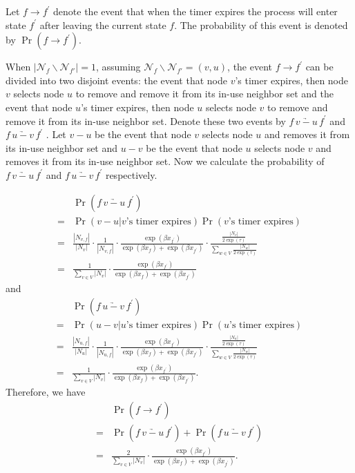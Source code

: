 \documentclass[10pt,conference]{IEEEtran}
\begin{document}
Let $f\rightarrow f^{'}$ denote the event that when the timer expires
the process will enter state $f^{'}$ after leaving the current state
$f$. The probability of this event is denoted by $\Pr(f\rightarrow f^{'})$.

When $|\mathcal{N}_{f}\backslash\mathcal{N}_{f'}|=1$,
assuming $\mathcal{N}_{f}\backslash\mathcal{N}_{f'}=(v,u)$,
the event $f\rightarrow f^{'}$ can be divided into two disjoint events: the
event that node $v$'s timer expires, then node $v$ selects node
$u$ to remove and remove it from its in-use neighbor set and the
event that node $u$'s timer expires, then node $u$ selects node
$v$ to remove and remove it from its in-use neighbor set. Denote
these two events by $f\,\underrightarrow{v-u}\, f^{'}$ and $f\,\underrightarrow{u-v}\, f^{'}$
. Let $v-u$ be the event that node $v$ selects node $u$ and removes
it from its in-use neighbor set and $u-v$ be the event that node
$u$ selects node $v$ and removes it from its in-use neighbor set.
Now we calculate the probability of $f\,\underrightarrow{v-u}\, f^{'}$
and $f\,\underrightarrow{u-v}\, f^{'}$ respectively.

\begin{align}
 & \Pr(f\,\underrightarrow{v-u}\, f^{'})\nonumber \\
= & \Pr(v-u|v\mbox{'s timer expires})\Pr(v\mbox{'s timer expires})\nonumber \\
= & \frac{|N_{v,f}|}{|N_{v}|}\cdot\frac{1}{|N_{v,f}|}\cdot\frac{\exp(\beta x_{f^{'}})}{\exp(\beta x_{f})+\exp(\beta x_{f^{'}})}\cdot\frac{\frac{|N_{v}|}{2\exp(\tau)}}{\sum_{w\in V}\frac{|N_{w}|}{2\exp(\tau)}}\nonumber \\
= & \frac{1}{\sum_{v\in V}|N_{v}|}\cdot\frac{\exp(\beta x_{f^{'}})}{\exp(\beta x_{f})+\exp(\beta x_{f^{'}})}
\end{align}
and
\begin{align}
 & \Pr(f\,\underrightarrow{u-v}\, f^{'})\nonumber \\
= & \Pr(u-v|u\mbox{'s timer expires})\Pr(u\mbox{'s timer expires})\nonumber \\
= & \frac{|N_{u,f}|}{|N_{u}|}\cdot\frac{1}{|N_{u,f}|}\cdot\frac{\exp(\beta x_{f^{'}})}{\exp(\beta x_{f})+\exp(\beta x_{f^{'}})}\cdot\frac{\frac{|N_{u}|}{2\exp(\tau)}}{\sum_{w\in V}\frac{|N_{w}|}{2\exp(\tau)}}\nonumber \\
= & \frac{1}{\sum_{v\in V}|N_{v}|}\cdot\frac{\exp(\beta x_{f^{'}})}{\exp(\beta x_{f})+\exp(\beta x_{f^{'}})}.
\end{align}
Therefore, we have
\begin{align}
 & \Pr(f\rightarrow f^{'})\nonumber \\
= & \Pr(f\,\underrightarrow{v-u}\, f^{'})+\Pr(f\,\underrightarrow{u-v}\, f^{'})\nonumber \\
= & \frac{2}{\sum_{v\in V}|N_{v}|}\cdot\frac{\exp(\beta x_{f^{'}})}{\exp(\beta x_{f})+\exp(\beta x_{f^{'}})}.
\end{align}
\end{document}
